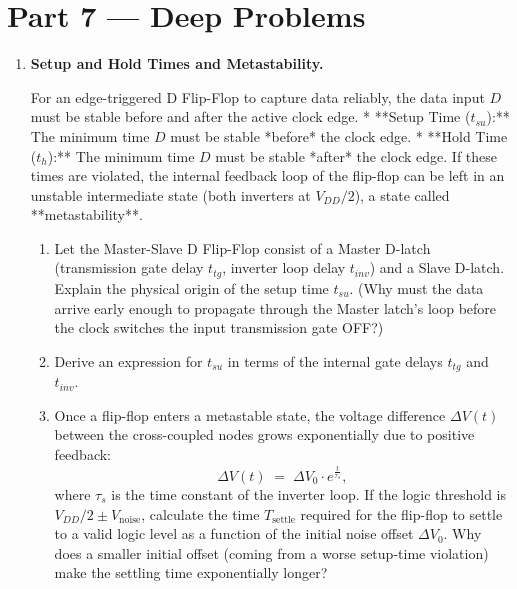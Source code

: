 \documentclass[12pt, a4paper]{book}
\begin{document}
\section{Part 7 --- Deep Problems}

\begin{deepbox}
\begin{enumerate}[label=\textbf{D\arabic*.}]
  \item \textbf{Setup and Hold Times and Metastability.}
  
        For an edge-triggered D Flip-Flop to capture data reliably, the data input $D$ must be stable before and after the active clock edge.
        * **Setup Time ($t_{su}$):** The minimum time $D$ must be stable *before* the clock edge.
        * **Hold Time ($t_h$):** The minimum time $D$ must be stable *after* the clock edge.
        If these times are violated, the internal feedback loop of the flip-flop can be left in an unstable intermediate state (both inverters at $V_{DD}/2$), a state called **metastability**.
        
        \begin{enumerate}[label=(\alph*)]
          \item Let the Master-Slave D Flip-Flop consist of a Master D-latch (transmission gate delay $t_{tg}$, inverter loop delay $t_{inv}$) and a Slave D-latch.
                Explain the physical origin of the setup time $t_{su}$. (Why must the data arrive early enough to propagate through the Master latch's loop before the clock switches the input transmission gate OFF?)
          \item Derive an expression for $t_{su}$ in terms of the internal gate delays $t_{tg}$ and $t_{inv}$.
          \item Once a flip-flop enters a metastable state, the voltage difference $\Delta V(t)$ between the cross-coupled nodes grows exponentially due to positive feedback:
                \[
                  \Delta V(t) \;=\; \Delta V_0 \cdot e^{\frac{t}{\tau_s}},
                \]
                where $\tau_s$ is the time constant of the inverter loop.
                If the logic threshold is $V_{DD}/2 \pm V_{\text{noise}}$, calculate the time $T_{\text{settle}}$ required for the flip-flop to settle to a valid logic level as a function of the initial noise offset $\Delta V_0$.
                Why does a smaller initial offset (coming from a worse setup-time violation) make the settling time exponentially longer?
        \end{enumerate}


\end{enumerate}
\end{deepbox}
\end{document}
